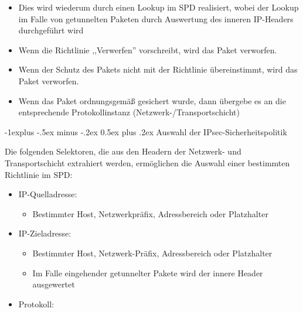 \documentclass[a4paper]{article}
\makeatletter
\renewcommand{\subsection}{\@startsection{subsection}{2}{0mm}%
 {-1explus -.5ex minus -.2ex}%
 {0.5ex plus .2ex}%
 {\normalfont\normalsize\bfseries}}
\makeatother
\begin{document}
\begin{multicols}{3}
\begin{itemize}
\begin{itemize}
                        \begin{itemize}
                            \item
                                  Dies wird wiederum durch einen Lookup im SPD realisiert, wobei der
                                  Lookup im Falle von getunnelten Paketen durch Auswertung des
                                  inneren IP-Headers durchgeführt wird
                            \item
                                  Wenn die Richtlinie ,,Verwerfen'' vorschreibt, wird das Paket
                                  verworfen.
                            \item
                                  Wenn der Schutz des Pakets nicht mit der Richtlinie übereinstimmt,
                                  wird das Paket verworfen.
                            \item
                                  Wenn das Paket ordnungsgemäß gesichert wurde, dann übergebe es an
                                  die entsprechende Protokollinstanz (Netzwerk-/Transportschicht)
                        \end{itemize}
              \end{itemize}
    \end{itemize}


    \subsection{Auswahl der
        IPsec-Sicherheitspolitik}

    Die folgenden Selektoren, die aus den Headern der Netzwerk- und
    Transportschicht extrahiert werden, ermöglichen die Auswahl einer
    bestimmten Richtlinie im SPD:

    \begin{itemize}
        \item
              IP-Quelladresse:

              \begin{itemize}
                  \item
                        Bestimmter Host, Netzwerkpräfix, Adressbereich oder Platzhalter
              \end{itemize}
        \item
              IP-Zieladresse:

              \begin{itemize}
                  \item
                        Bestimmter Host, Netzwerk-Präfix, Adressbereich oder Platzhalter
                  \item
                        Im Falle eingehender getunnelter Pakete wird der innere Header
                        ausgewertet
              \end{itemize}
        \item
              Protokoll:


\end{itemize}
\end{multicols}
\end{document}
